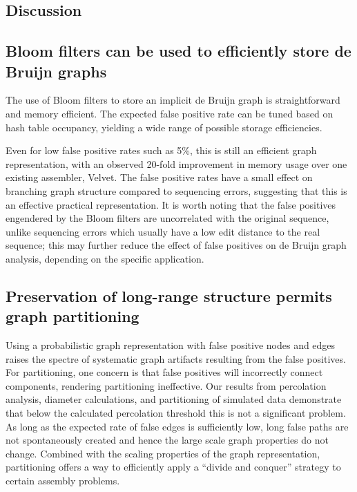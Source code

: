 \documentclass{pnastwo}
\begin{document}
\begin{article}

\section{Discussion}


\subsection{Bloom filters can be used to efficiently store de Bruijn graphs}

The use of Bloom filters to store an implicit de Bruijn graph is
straightforward and memory efficient.  The expected false positive
rate can be tuned based on hash table occupancy, yielding a wide range
of possible storage efficiencies.

Even for low false positive rates such as 5\%, this is still an
efficient graph representation, with an observed 20-fold improvement
in memory usage over one existing assembler, Velvet.  The false
positive rates have a small effect on branching graph structure
compared to sequencing errors, suggesting that this is an effective
practical representation.  It is worth noting that the false positives
engendered by the Bloom filters are uncorrelated with the original
sequence, unlike sequencing errors which usually have a low edit
distance to the real sequence; this may further reduce the effect of
false positives on de Bruijn graph analysis, depending on the specific
application.

\subsection{Preservation of long-range structure permits graph partitioning}

Using a probabilistic graph representation with false positive nodes
and edges raises the spectre of systematic graph artifacts resulting
from the false positives.  For partitioning, one concern is that false
positives will incorrectly connect components, rendering partitioning
ineffective.  Our results from percolation analysis, diameter
calculations, and partitioning of simulated data demonstrate that
below the calculated percolation threshold this is not a significant
problem.  As long as the expected rate of false edges is sufficiently
low, long false paths are not spontaneously created and hence the
large scale graph properties do not change.  Combined with the scaling
properties of the graph representation, partitioning offers a way to
efficiently apply a ``divide and conquer'' strategy to certain
assembly problems.


\end{article}
\end{document}
